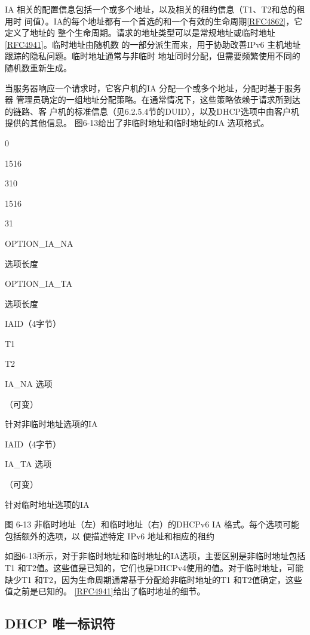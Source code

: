 IA 相关的配置信息包括一个或多个地址，以及相关的租约信息（T1、T2和总的租用时
间值）。IA的每个地址都有一个首选的和一个有效的生命周期\href{https://www.rfc-editor.org/rfc/rfc4862}{\href{https://www.rfc-editor.org/rfc/rfc4862}{[RFC4862]}}，它定义了地址的
整个生命周期。请求的地址类型可以是常规地址或临时地址\href{https://www.rfc-editor.org/rfc/rfc4941}{\href{https://www.rfc-editor.org/rfc/rfc4941}{[RFC4941]}}。临时地址由随机数
的一部分派生而来，用于协助改善IPv6 主机地址跟踪的隐私问题。临时地址通常与非临时
地址同时分配，但需要频繁使用不同的随机数重新生成。

当服务器响应一个请求时，它客户机的IA 分配一个或多个地址，分配时基于服务器
管理员确定的一组地址分配策略。在通常情况下，这些策略依赖于请求所到达的链路、客
户机的标准信息（见6.2.5.4节的DUID），以及DHCP选项中由客户机提供的其他信息。
图6-13给出了非临时地址和临时地址的IA 选项格式。

0

1516

310

1516

31

OPTION\_IA\_NA

选项长度

OPTION\_IA\_TA

选项长度

IAID（4字节）

T1

T2

IA\_NA 选项

（可变）

针对非临时地址选项的IA

IAID（4字节）

IA\_TA 选项

（可变）

针对临时地址选项的IA

图 6-13
非临时地址（左）和临时地址（右）的DHCPv6 IA 格式。每个选项可能包括额外的选项，以
便描述特定 IPv6 地址和相应的租约

如图6-13所示，对于非临时地址和临时地址的IA选项，主要区别是非临时地址包括
T1 和T2值。这些值是已知的，它们也是DHCPv4使用的值。对于临时地址，可能缺少T1
和T2，因为生命周期通常基于分配给非临时地址的T1 和T2值确定，这些值之前是已知的。
\href{https://www.rfc-editor.org/rfc/rfc4941}{\href{https://www.rfc-editor.org/rfc/rfc4941}{[RFC4941]}}给出了临时地址的细节。

\subsection{ DHCP 唯一标识符}

